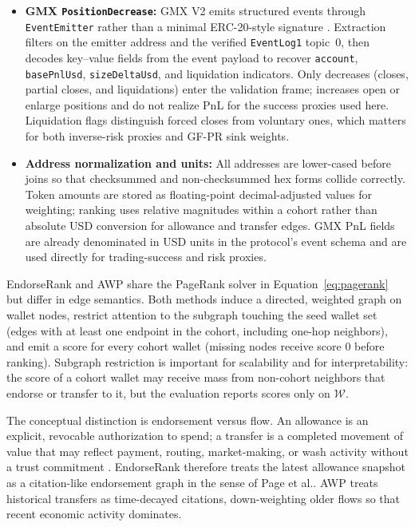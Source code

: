 \begin{itemize}
\item \textbf{GMX \texttt{PositionDecrease}:} GMX V2 emits structured events through \texttt{EventEmitter} rather than a minimal ERC-20-style signature . Extraction filters on the emitter address and the verified \texttt{EventLog1} topic~$0$, then decodes key--value fields from the event payload to recover \texttt{account}, \texttt{basePnlUsd}, \texttt{sizeDeltaUsd}, and liquidation indicators. Only decreases (closes, partial closes, and liquidations) enter the validation frame; increases open or enlarge positions and do not realize PnL for the success proxies used here. Liquidation flags distinguish forced closes from voluntary ones, which matters for both inverse-risk proxies and GF-PR sink weights.

\item \textbf{Address normalization and units:} All addresses are lower-cased before joins so that checksummed and non-checksummed hex forms collide correctly. Token amounts are stored as floating-point decimal-adjusted values for weighting; ranking uses relative magnitudes within a cohort rather than absolute USD conversion for allowance and transfer edges. GMX PnL fields are already denominated in USD units in the protocol's event schema and are used directly for trading-success and risk proxies.

\end{itemize}


EndorseRank and AWP share the PageRank solver in Equation~\eqref{eq:pagerank} but differ in edge semantics. Both methods induce a directed, weighted graph on wallet nodes, restrict attention to the subgraph touching the seed wallet set (edges with at least one endpoint in the cohort, including one-hop neighbors), and emit a score for every cohort wallet (missing nodes receive score $0$ before ranking). Subgraph restriction is important for scalability and for interpretability: the score of a cohort wallet may receive mass from non-cohort neighbors that endorse or transfer to it, but the evaluation reports scores only on $\mathcal{W}$.

The conceptual distinction is endorsement versus flow. An allowance is an explicit, revocable authorization to spend; a transfer is a completed movement of value that may reflect payment, routing, market-making, or wash activity without a trust commitment . EndorseRank therefore treats the latest allowance snapshot as a citation-like endorsement graph in the sense of Page et al.. AWP treats historical transfers as time-decayed citations, down-weighting older flows so that recent economic activity dominates.

